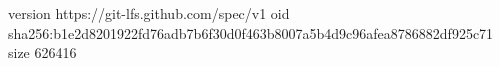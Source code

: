 version https://git-lfs.github.com/spec/v1
oid sha256:b1e2d8201922fd76adb7b6f30d0f463b8007a5b4d9c96afea8786882df925c71
size 626416
